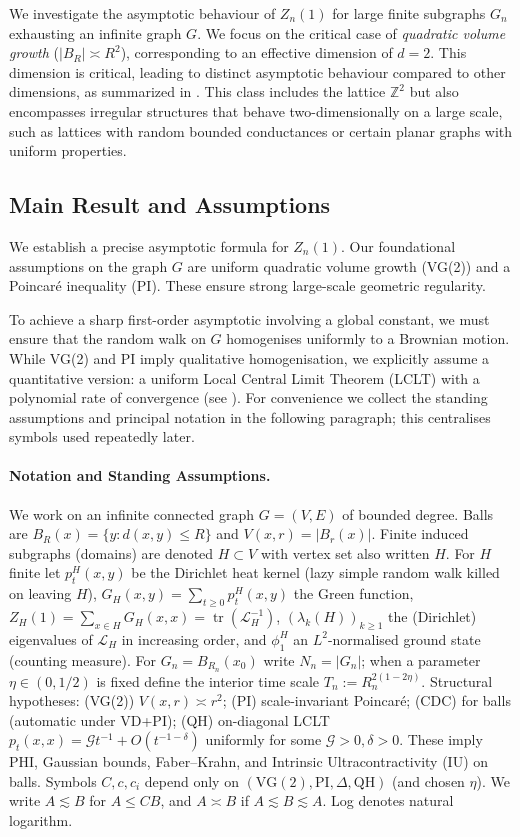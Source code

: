 \documentclass{article}
\numberwithin{equation}{section}
\theoremstyle{definition}
\theoremstyle{remark}
\newcommand{\cG}{\mathcal{G}}
\newcommand{\LL}{\mathcal{L}}
\begin{document}
We investigate the asymptotic behaviour of $Z_n(1)$ for large finite subgraphs $G_n$ exhausting an infinite graph $G$. We focus on the critical case of \emph{quadratic volume growth} ($|B_R| \asymp R^2$), corresponding to an effective dimension of $d=2$. This dimension is critical, leading to distinct asymptotic behaviour compared to other dimensions, as summarized in . This class includes the lattice $\mathbb{Z}^2$ but also encompasses irregular structures that behave two-dimensionally on a large scale, such as lattices with random bounded conductances or certain planar graphs with uniform properties.

\subsection{Main Result and Assumptions}
We establish a precise asymptotic formula for $Z_n(1)$. Our foundational assumptions on the graph $G$ are uniform quadratic volume growth (VG(2)) and a Poincaré inequality (PI). These ensure strong large-scale geometric regularity.

To achieve a sharp first-order asymptotic involving a global constant, we must ensure that the random walk on $G$ homogenises uniformly to a Brownian motion. While VG(2) and PI imply qualitative homogenisation, we explicitly assume a quantitative version: a uniform Local Central Limit Theorem (LCLT) with a polynomial rate of convergence (see ). For convenience we collect the standing assumptions and principal notation in the following paragraph; this centralises symbols used repeatedly later.

\paragraph{Notation and Standing Assumptions.} We work on an infinite connected graph $G=(V,E)$ of bounded degree. Balls are $B_R(x)=\{y:d(x,y)\le R\}$ and $V(x,r)=|B_r(x)|$. Finite induced subgraphs (domains) are denoted $H\subset V$ with vertex set also written $H$. For $H$ finite let $p_t^{H}(x,y)$ be the Dirichlet heat kernel (lazy simple random walk killed on leaving $H$), $G_H(x,y)=\sum_{t\ge0} p_t^{H}(x,y)$ the Green function, $Z_H(1)=\sum_{x\in H} G_H(x,x)=\operatorname{tr}(\LL_H^{-1})$, $(\lambda_k(H))_{k\ge1}$ the (Dirichlet) eigenvalues of $\LL_H$ in increasing order, and $\phi_1^{H}$ an $L^2$-normalised ground state (counting measure). For $G_n=B_{R_n}(x_0)$ write $N_n=|G_n|$; when a parameter $\eta\in(0,1/2)$ is fixed define the interior time scale $T_n:=R_n^{2(1-2\eta)}$. Structural hypotheses: (VG(2)) $V(x,r)\asymp r^2$; (PI) scale-invariant Poincaré; (CDC) for balls (automatic under VD+PI); (QH) on-diagonal LCLT $p_t(x,x)=\cG t^{-1}+O(t^{-1-\delta})$ uniformly for some $\cG>0,\delta>0$. These imply PHI, Gaussian bounds, Faber--Krahn, and Intrinsic Ultracontractivity (IU) on balls. Symbols $C,c,c_i$ depend only on $(\mathrm{VG(2)},\mathrm{PI},\Delta,\mathrm{QH})$ (and chosen $\eta$). We write $A\lesssim B$ for $A\le C B$, and $A\asymp B$ if $A\lesssim B\lesssim A$. Log denotes natural logarithm.
\end{document}
